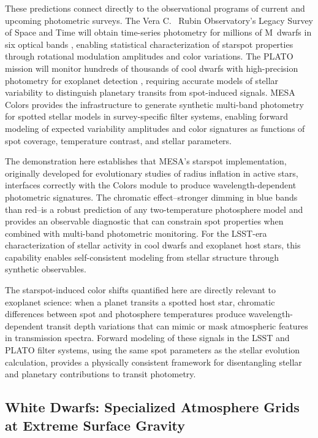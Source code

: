 \documentclass[linenumbers,apj,twocolumn, floatfix]{aastex701}
\begin{document}
These predictions connect directly to the observational programs of current and upcoming photometric surveys.
The Vera C.
\ Rubin Observatory's Legacy Survey of Space and Time will obtain time-series photometry for millions of M~dwarfs in six optical bands \citep{LSST}, enabling statistical characterization of starspot properties through rotational modulation amplitudes and color variations.
The PLATO mission will monitor hundreds of thousands of cool dwarfs with high-precision photometry for exoplanet detection \citep{plato}, requiring accurate models of stellar variability to distinguish planetary transits from spot-induced signals.
MESA Colors provides the infrastructure to generate synthetic multi-band photometry for spotted stellar models in survey-specific filter systems, enabling forward modeling of expected variability amplitudes and color signatures as functions of spot coverage, temperature contrast, and stellar parameters.

The demonstration here establishes that MESA's starspot implementation, originally developed for evolutionary studies of radius inflation in active stars, interfaces correctly with the Colors module to produce wavelength-dependent photometric signatures.
The chromatic effect--stronger dimming in blue bands than red--is a robust prediction of any two-temperature photosphere model and provides an observable diagnostic that can constrain spot properties when combined with multi-band photometric monitoring.
For the LSST-era characterization of stellar activity in cool dwarfs and exoplanet host stars, this capability enables self-consistent modeling from stellar structure through synthetic observables.

The starspot-induced color shifts quantified here are directly relevant to exoplanet science: when a planet transits a spotted host star, chromatic differences between spot and photosphere temperatures produce wavelength-dependent transit depth variations that can mimic or mask atmospheric features in transmission spectra.
Forward modeling of these signals in the LSST and PLATO filter systems, using the same spot parameters as the stellar evolution calculation, provides a physically consistent framework for disentangling stellar and planetary contributions to transit photometry.

\subsection{White Dwarfs: Specialized Atmosphere Grids at Extreme Surface Gravity}
\label{sec:demo_wd}
\end{document}
